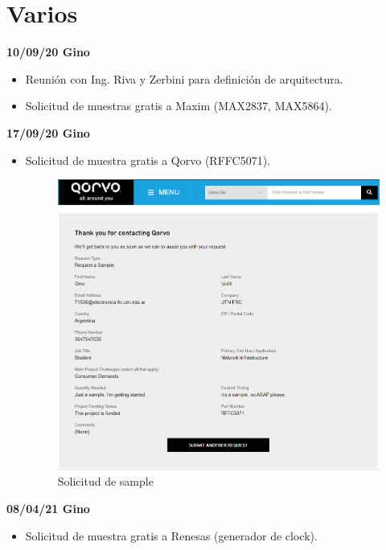 \documentclass[a4paper,12pt]{report} %
\begin{document}
\chapter*{Varios}

\textbf{10/09/20 Gino}
\begin{itemize}
	\item Reunión con Ing. Riva y Zerbini para definición de arquitectura.
	\item Solicitud de muestras gratis a Maxim (MAX2837, MAX5864).
\end{itemize}
\textbf{17/09/20 Gino}
\begin{itemize}
	\item Solicitud de muestra gratis a Qorvo (RFFC5071).
	\begin{figure}[H]
		\centering
		\includegraphics[scale=0.6]{Imagenes/sample_qorvo}
		\caption{Solicitud de sample}
	\end{figure}
\end{itemize}
\textbf{08/04/21 Gino}
\begin{itemize}
	\item Solicitud de muestra gratis a Renesas (generador de clock).
\end{itemize}






	

\nocite{*}
\end{document}
